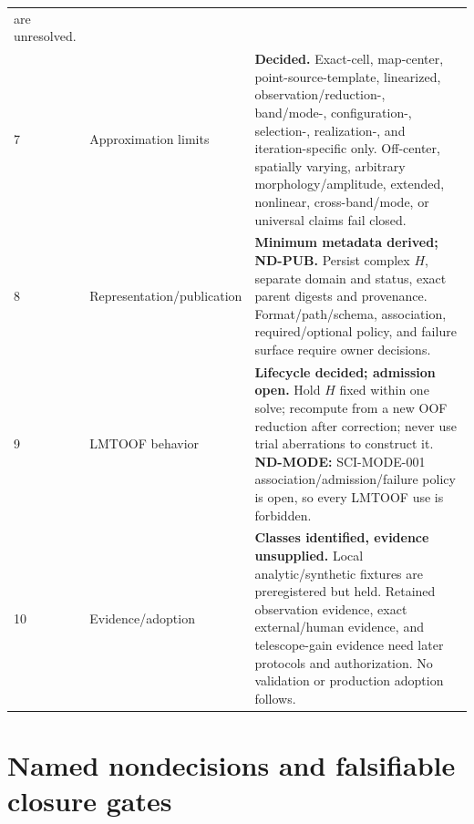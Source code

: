 \documentclass[11pt]{article}
\begin{document}
\begin{longtable}{@{}L{0.05\textwidth}L{0.24\textwidth}L{0.62\textwidth}@{}}
are unresolved. \\
7 & Approximation limits & \textbf{Decided.}  Exact-cell, map-center,
point-source-template, linearized, observation/reduction-, band/mode-,
configuration-, selection-, realization-, and iteration-specific only.
Off-center, spatially varying, arbitrary morphology/amplitude, extended,
nonlinear, cross-band/mode, or universal claims fail closed. \\
8 & Representation/publication & \textbf{Minimum metadata derived; ND-PUB.}
Persist complex $H$, separate domain and status, exact parent digests and
provenance.  Format/path/schema, association, required/optional policy, and
failure surface require owner decisions. \\
9 & LMTOOF behavior & \textbf{Lifecycle decided; admission open.}  Hold $H$
fixed within one solve; recompute from a new OOF reduction after correction;
never use trial aberrations to construct it.  \textbf{ND-MODE:} SCI-MODE-001
association/admission/failure policy is open, so every LMTOOF use is forbidden. \\
10 & Evidence/adoption & \textbf{Classes identified, evidence unsupplied.}
Local analytic/synthetic fixtures are preregistered but held.  Retained
observation evidence, exact external/human evidence, and telescope-gain
evidence need later protocols and authorization.  No validation or production
adoption follows. \\
\bottomrule
\end{longtable}

\section{Named nondecisions and falsifiable closure gates}
\end{document}
